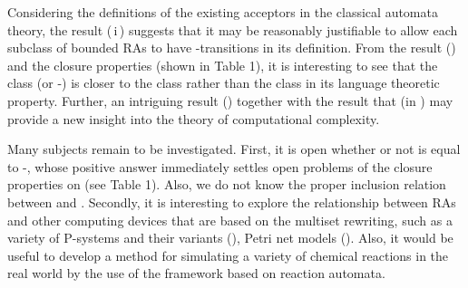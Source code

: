 \documentclass[preprint,fleqn,1p]{elsarticle}
\def\rnum#1{\resizebox{0.5em}{\height}{\expandafter{\romannumeral #1}}}
\begin{document}
Considering  the definitions of  the existing acceptors in the classical automata theory, the result (\,i\,) suggests that it may be  reasonably justifiable to allow each  subclass of bounded RAs to have -transitions in its definition. 
 From the result (\rnum{2}) and the closure properties (shown in Table 1), it is interesting to see that the class    (or -) is closer to the class  rather than the class  in its language theoretic property.  Further,  
an intriguing  result (\rnum{3}) together with the result that  (in \cite{OKY:12}) may provide a new insight into the theory of computational complexity.  

Many subjects remain to be investigated. First, it is open whether or not  is equal to -, whose positive answer immediately settles open problems of the closure properties on  
 (see Table 1).  Also, we do not know the proper inclusion relation between  and . Secondly, it is interesting to explore the relationship between RAs and other computing devices that are based on the multiset rewriting, such as a variety of P-systems and their variants (\cite{PP:11}),  Petri net models (\cite{HM:01}).  Also, it would be useful to develop a method for simulating a variety of chemical reactions in the real world by the use of the framework based on reaction automata.
\end{document}
